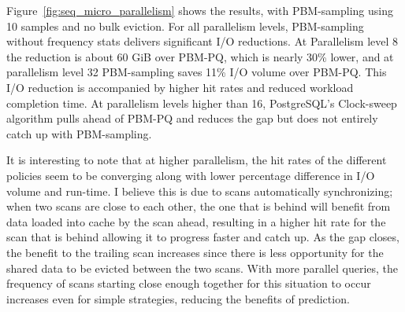 


 
Figure~\ref{fig:seq_micro_parallelism} shows the results, with PBM-sampling using 10 samples and no bulk eviction. For all parallelism levels, PBM-sampling without frequency stats delivers significant I/O reductions. At Parallelism level 8 the reduction is about 60 GiB over PBM-PQ, which is nearly 30\% lower, and at parallelism level 32 PBM-sampling saves 11\% I/O volume over PBM-PQ. This I/O reduction is accompanied by higher hit rates and reduced workload completion time. At parallelism levels higher than 16, PostgreSQL's Clock-sweep algorithm pulls ahead of PBM-PQ and reduces the gap but does not entirely catch up with PBM-sampling.

It is interesting to note that at higher parallelism, the hit rates of the different policies seem to be converging along with lower percentage difference in I/O volume and run-time. I believe this is due to scans automatically synchronizing; when two scans are close to each other, the one that is behind will benefit from data loaded into cache by the scan ahead, resulting in a higher hit rate for the scan that is behind allowing it to progress faster and catch up. As the gap closes, the benefit to the trailing scan increases since there is less opportunity for the shared data to be evicted between the two scans. With more parallel queries, the frequency of scans starting close enough together for this situation to occur increases even for simple strategies, reducing the benefits of prediction.

